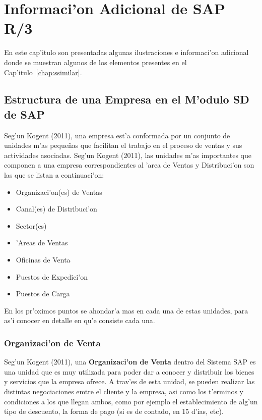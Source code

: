 \chapter{Informaci'on Adicional de SAP R/3}

	En este cap'itulo son presentadas algunas ilustraciones e informaci'on adicional donde se muestran algunos de los elementos presentes en el Cap'itulo~\ref{chap:ssimilar}.

\section{Estructura de una Empresa en el M'odulo SD de SAP}\label{sect:estructura}
Seg'un Kogent (2011), una empresa est'a conformada por un conjunto de unidades m'as peque\~nas que facilitan el trabajo en el proceso de ventas y sus actividades asociadas.
\newline
\indent Seg'un Kogent (2011), las unidades m'as importantes que componen a una empresa correspondientes al 'area de Ventas y Distribuci'on son las que se listan a continuaci'on:

\begin{itemize}
\item Organizaci'on(es) de Ventas
\item Canal(es) de Distribuci'on
\item Sector(es)
\item 'Areas de Ventas
\item Oficinas de Venta
\item Puestos de Expedici'on
\item Puestos de Carga
\end{itemize}

	En los pr'oximos puntos se ahondar'a mas en cada una de estas unidades, para as'i conocer en detalle en qu'e consiste cada una.
	
\subsection{Organizaci'on de Venta}
	Seg'un Kogent (2011), una \textbf{Organizaci'on de Venta} dentro del Sistema SAP es una unidad que es muy utilizada para poder dar a conocer y distribuir los bienes y servicios que la empresa ofrece. A trav'es de esta unidad, se pueden realizar las distintas negociaciones emtre el cliente y la empresa, asi como los t'erminos y condiciones a los que llegan ambos, como por ejemplo el establecimiento de alg'un tipo de descuento, la forma de pago (si es de contado, en 15 d'ias, etc). 
	
